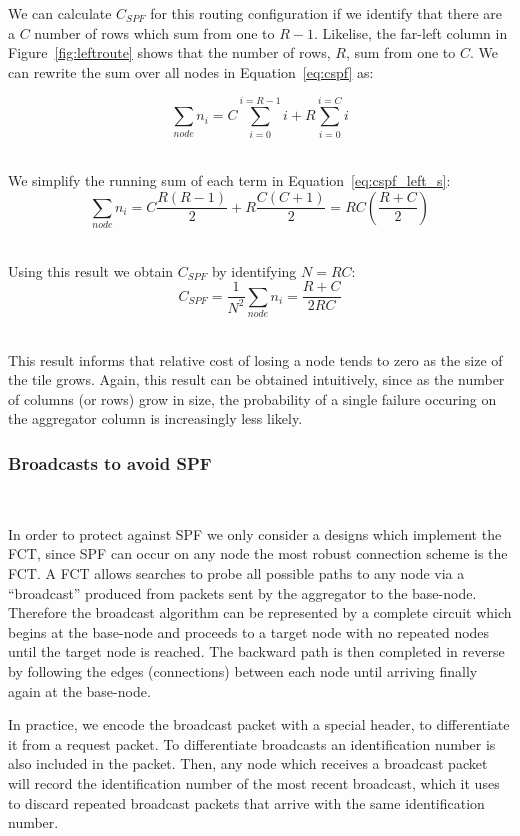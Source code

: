 We can calculate $C_{SPF}$ for this routing configuration if we identify that there are a $C$ number of rows which sum from one to $R-1$.
Likelise, the far-left column in Figure~\ref{fig:leftroute} shows that the number of rows, $R$, sum from one to $C$.
We can rewrite the sum over all nodes in Equation~\ref{eq:cspf} as:

\begin{equation}
  \sum_{node}n_{i} = C\sum_{i=0}^{i=R-1}i + R\sum_{i=0}^{i=C}i
\end{equation}~\label{eq:cspf_left_s}

We simplify the running sum of each term in Equation~\ref{eq:cspf_left_s}:
\begin{equation}
  \sum_{node}n_{i} = C\frac{R(R-1)}{2} + R\frac{C(C+1)}{2} = RC(\frac{R+C}{2})
\end{equation}~\label{eq:cspf_left_e}

Using this result we obtain $C_{SPF}$ by identifying $N = RC$:
\begin{equation}
  C_{SPF} = \frac{1}{N^{2}}\sum_{node}n_{i} = \boxed{\frac{R+C}{2RC}}
\end{equation}~\label{eq:cspf_left_fin}

This result informs that relative cost of losing a node tends to zero as the size of the tile grows.
Again, this result can be obtained intuitively, since as the number of columns (or rows) grow in size, the probability of a single failure occuring on the aggregator column is increasingly less likely.


\subsubsection{Broadcasts to avoid SPF}~\label{sec:broadcast}

In order to protect against SPF we only consider a designs which implement the FCT, since SPF can occur on any node the most robust connection scheme is the FCT.
A FCT allows searches to probe all possible paths to any node via a ``broadcast'' produced from packets sent by the aggregator to the base-node.
Therefore the broadcast algorithm can be represented by a complete circuit which begins at the base-node and proceeds to a target node with no repeated nodes until the target node is reached.
The backward path is then completed in reverse by following the edges (connections) between each node until arriving finally again at the base-node.

In practice, we encode the broadcast packet with a special header, to differentiate it from a request packet. 
To differentiate broadcasts an identification number is also included in the packet.
Then, any node which receives a broadcast packet will record the identification number of the most recent broadcast, which it uses to discard repeated broadcast packets that arrive with the same identification number.

